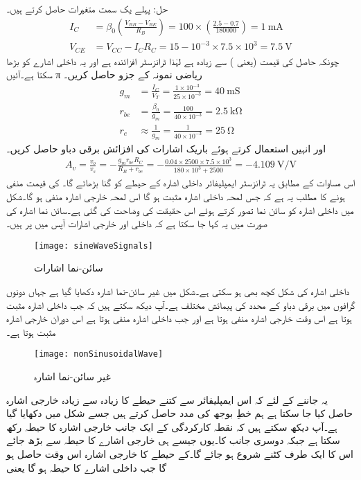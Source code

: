 حل:	پہلے یک سمت متغیرات حاصل کرتے ہیں۔
\begin{align*}
I_C&=\beta_0 \left(\frac{V_{BB}-V_{BE}}{R_B} \right )=100 \times \left(\frac{2.5-0.7}{180000} \right )=\SI{1}{\milli \ampere}\\
V_{CE}&=V_{CC}-I_C R_C=15-10^{-3} \times 7.5 \times 10^{3}=\SI{7.5}{\volt}
\end{align*}
چونکہ حاصل  کی قیمت   (یعنی ) سے زیادہ ہے لہٰذا ٹرانزسٹر افزائندہ ہے اور یہ داخلی اشارے کو بڑھا سکتا ہے۔آئیں π ریاضی نمونہ  کے جزو حاصل کریں۔
\begin{align*}
g_m &=\frac{I_C}{V_T}=\frac{1 \times 10^{-3}}{25 \times 10^{-3}}=\SI{40}{\milli \siemens}\\
r_{be}&=\frac{\beta_0}{g_m}=\frac{100}{40 \times 10^{-3}}=\SI{2.5}{\kilo \ohm}\\
r_e& \approx \frac{1}{g_m}=\frac{1}{40 \times 10^{-3}}=\SI{25}{\ohm}
\end{align*}
اور انہیں استعمال کرتے ہوئے باریک اشارات کی افزائش برقی دباو  حاصل کریں۔
\begin{align*}
A_v =\frac{v_o}{v_s}=-\frac{g_m r_{be} R_C}{ R_B+r_{be}}=-\frac{0.04 \times 2500 \times 7.5 \times 10^3}{180 \times 10^{3}+2500}=\SI[per=frac,fraction=nice]{-4.109}{\volt \per \volt}
\end{align*}
اس مساوات کے مطابق یہ ٹرانزسٹر ایمپلیفائر داخلی اشارہ  کے حیطے کو  گنا بڑھائے گا۔ کی قیمت منفی ہونے کا مطلب یہ ہے کہ جس لمحہ داخلی اشارہ مثبت ہو گا اس لمحہ خارجی اشارہ منفی ہو گا۔شکل میں داخلی اشارہ کو سائن نما تصور کرتے ہوئے اس حقیقت کی وضاحت کی گئی ہے۔سائن نما اشارہ کی صورت میں یہ کہا جا سکتا ہے کہ داخلی اور خارجی اشارات آپس میں  پر ہیں۔ 
\begin{figure}
\centering
\texttt{[image: sineWaveSignals]}
\caption{سائن-نما اشارات}
\label{شکل_سائن_نما_اشارات}
\end{figure}
داخلی اشارہ کی شکل کچھ بھی ہو سکتی ہے۔شکل   میں غیر سائن-نما اشارہ دکھایا گیا ہے جہاں دونوں گرافوں میں برقی دباو کے محدد کی پیمائش مختلف ہے۔آپ دیکھ سکتے ہیں کہ جب داخلی اشارہ مثبت ہوتا ہے اس وقت خارجی اشارہ منفی ہوتا ہے اور جب داخلی اشارہ منفی ہوتا ہے اس دوران خارجی اشارہ مثبت ہوتا ہے۔ 
\begin{figure}
\centering
\texttt{[image: nonSinusoidalWave]}
\caption{غیر سائن-نما اشارہ}
\label{شکل_غیر_سائن_نما_اشارہ}
\end{figure}
یہ جاننے کے لئے کہ اس ایمپلیفائر سے کتنے حیطے کا زیادہ سے زیادہ خارجی اشارہ   حاصل کیا جا سکتا ہے ہم خطِ بوجھ  کی مدد حاصل کرتے ہیں جسے شکل   میں دکھایا گیا ہے۔آپ دیکھ سکتے ہیں کہ نقطہ کارکردگی کے ایک جانب خارجی اشارہ  کا حیطہ رکھ سکتا ہے جبکہ دوسری جانب  کا۔یوں جیسے ہی خارجی اشارے کا حیطہ  سے بڑھ جائے اس کا ایک طرف کٹنے شروع ہو جائے گا۔کے حیطے کا خارجی اشارہ اس وقت حاصل ہو گا جب داخلی اشارے کا حیطہ   ہو گا یعنی
